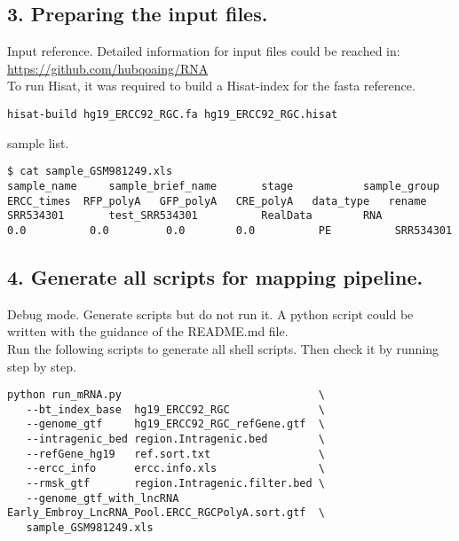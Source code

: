 \subsection{3. Preparing the input files.}
\begin{frame}[c,fragile]

	\begin{block}{ Input reference. }
Detailed information for input files could be reached in:
\url{https://github.com/hubqoaing/RNA} \\
To run Hisat, it was required to build a Hisat-index for the fasta reference.
		\begin{lstlisting}
hisat-build hg19_ERCC92_RGC.fa hg19_ERCC92_RGC.hisat
		\end{lstlisting}
	\end{block}
	\pause
	\begin{block}{ sample list. }
		\begin{lstlisting}[basicstyle=\tiny]
$ cat sample_GSM981249.xls
sample_name		sample_brief_name		stage			sample_group	ERCC_times	RFP_polyA	GFP_polyA	CRE_polyA	data_type	rename
SRR534301		test_SRR534301			RealData		RNA            0.0    		0.0    		0.0		   0.0		 	PE          SRR534301
		\end{lstlisting}
	\end{block}

\end{frame}

\subsection{4. Generate all scripts for mapping pipeline.}
\begin{frame}[c,fragile]

	\begin{block}{ Debug mode. Generate scripts but do not run it. }
A python script could be written with the guidance of the README.md file. \\
Run the following scripts to generate all shell scripts. Then check it by running step by step.
		\begin{lstlisting}[basicstyle=\tiny]
python run_mRNA.py                               \
   --bt_index_base  hg19_ERCC92_RGC              \
   --genome_gtf     hg19_ERCC92_RGC_refGene.gtf  \
   --intragenic_bed region.Intragenic.bed        \
   --refGene_hg19   ref.sort.txt                 \
   --ercc_info      ercc.info.xls                \
   --rmsk_gtf       region.Intragenic.filter.bed \
   --genome_gtf_with_lncRNA  Early_Embroy_LncRNA_Pool.ERCC_RGCPolyA.sort.gtf  \
   sample_GSM981249.xls
		\end{lstlisting}
	\end{block}
\end{frame}


